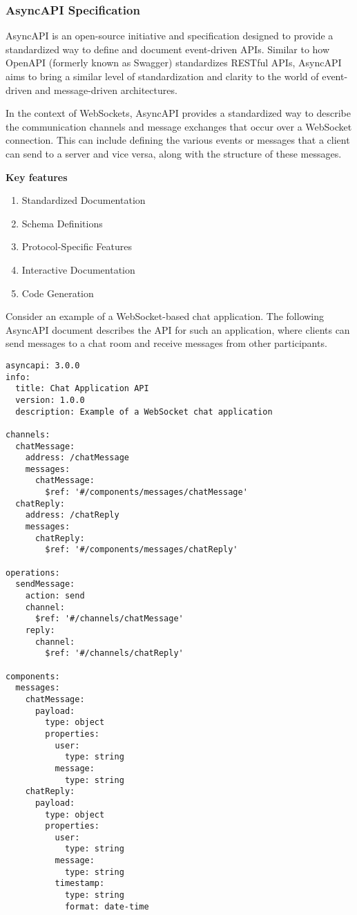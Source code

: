 \subsubsection{AsyncAPI Specification}

AsyncAPI is an open-source initiative and specification designed to provide a standardized way to define and document event-driven APIs. Similar to how OpenAPI (formerly known as Swagger) standardizes RESTful APIs, AsyncAPI aims to bring a similar level of standardization and clarity to the world of event-driven and message-driven architectures.

In the context of WebSockets, AsyncAPI provides a standardized way to describe the communication channels and message exchanges that occur over a WebSocket connection. This can include defining the various events or messages that a client can send to a server and vice versa, along with the structure of these messages.

\textbf{Key features}

\begin{enumerate}
  \item Standardized Documentation
  \item Schema Definitions
  \item Protocol-Specific Features
  \item Interactive Documentation
  \item Code Generation
\end{enumerate}

Consider an example of a WebSocket-based chat application. The following AsyncAPI document describes the API for such an application, where clients can send messages to a chat room and receive messages from other participants.

\begin{lstlisting}[caption=EventSource listening to the topic]
asyncapi: 3.0.0
info:
  title: Chat Application API
  version: 1.0.0
  description: Example of a WebSocket chat application

channels:
  chatMessage:
    address: /chatMessage
    messages:
      chatMessage:
        $ref: '#/components/messages/chatMessage'
  chatReply:
    address: /chatReply
    messages:
      chatReply:
        $ref: '#/components/messages/chatReply'

operations:
  sendMessage:
    action: send
    channel:
      $ref: '#/channels/chatMessage'
    reply:
      channel:
        $ref: '#/channels/chatReply'

components:
  messages:
    chatMessage:
      payload:
        type: object
        properties:
          user:
            type: string
          message:
            type: string
    chatReply:
      payload:
        type: object
        properties:
          user:
            type: string
          message:
            type: string
          timestamp:
            type: string
            format: date-time
\end{lstlisting}

